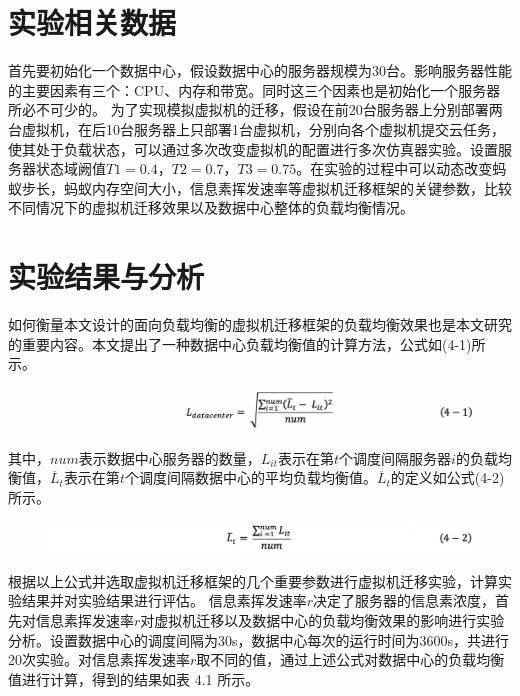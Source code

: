  \section{实验相关数据}
首先要初始化一个数据中心，假设数据中心的服务器规模为30台。影响服务器性能的主要因素有三个：CPU、内存和带宽。同时这三个因素也是初始化一个服务器所必不可少的。
为了实现模拟虚拟机的迁移，假设在前20台服务器上分别部署两台虚拟机，在后10台服务器上只部署1台虚拟机，分别向各个虚拟机提交云任务，使其处于负载状态，可以通过多次改变虚拟机的配置进行多次仿真器实验。设置服务器状态域阙值$ T1 = 0.4 $，$ T2 = 0.7 $，$ T3 = 0.75 $。在实验的过程中可以动态改变蚂蚁步长，蚂蚁内存空间大小，信息素挥发速率等虚拟机迁移框架的关键参数，比较不同情况下的虚拟机迁移效果以及数据中心整体的负载均衡情况。

 \section{实验结果与分析}
如何衡量本文设计的面向负载均衡的虚拟机迁移框架的负载均衡效果也是本文研究的重要内容。本文提出了一种数据中心负载均衡值的计算方法，公式如(4-1)所示。

\begin{figure}[htb]
  \centering
  \includegraphics[width=0.95\linewidth]{./Figure/IMG_Chap4_4.png}
\end{figure}

其中，$ num $表示数据中心服务器的数量，$ L_{it} $表示在第$ t $个调度间隔服务器$ i $的负载均衡值，$ \overline{L}_t $表示在第$ t $个调度间隔数据中心的平均负载均衡值。$ \overline{L}_t $的定义如公式(4-2)所示。

\begin{figure}[htb]
  \centering
  \includegraphics[width=0.95\linewidth]{./Figure/IMG_Chap4_5.png}
\end{figure}

根据以上公式并选取虚拟机迁移框架的几个重要参数进行虚拟机迁移实验，计算实验结果并对实验结果进行评估。
信息素挥发速率$ r $决定了服务器的信息素浓度，首先对信息素挥发速率$ r $对虚拟机迁移以及数据中心的负载均衡效果的影响进行实验分析。设置数据中心的调度间隔为30s，数据中心每次的运行时间为3600s，共进行20次实验。对信息素挥发速率$ r $取不同的值，通过上述公式对数据中心的负载均衡值进行计算，得到的结果如表 4.1 所示。

